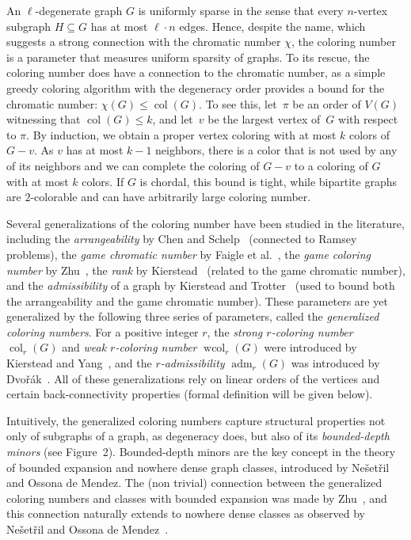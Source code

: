 \documentclass[1p,number,a4paper]{elsarticle}
\theoremstyle{remark}
\DeclareMathOperator{\col}{col}
\DeclareMathOperator{\wcol}{wcol}
\DeclareMathOperator{\adm}{adm}
\begin{document}
An $\ell$-degenerate graph $G$ is uniformly sparse in the
sense that every $n$-vertex subgraph $H\subseteq G$ 
has at most $\ell\cdot n$
edges.
Hence, despite the name, which suggests a strong connection with
the chromatic number $\chi$, the coloring number
is a parameter that measures uniform sparsity of graphs. 
To its rescue, the coloring number does have a connection to the chromatic number, as a simple greedy coloring algorithm with the degeneracy order provides a bound for the chromatic number: \mbox{$\chi(G)\leq \col(G)$}. To see this, 
let~$\pi$ be an order of $V(G)$ witnessing that $\col(G)\leq k$, 
and let~$v$ be 
the largest vertex of~$G$ with respect to $\pi$. By induction,
we obtain a proper vertex coloring with at most $k$ colors of 
$G-v$. As $v$ has at most $k-1$ neighbors, there is a 
color that is not used by any of its neighbors and we can complete
the coloring of $G-v$ to a coloring of $G$ with at most $k$ colors. 
If $G$ is chordal, this bound is 
tight, while bipartite graphs are $2$-colorable and 
can have arbitrarily large coloring number.

Several generalizations of the coloring number have been studied 
in the literature, including the \emph{arrangeability} by Chen and Schelp~\cite{chen1993graphs}  (connected to Ramsey problems), the \emph{game chromatic number} by Faigle et al.~\cite{faigle1993game}, the \emph{game coloring number} by Zhu~\cite{ZHU1999245}, the \emph{rank} by Kierstead~\cite{kierstead2000simple} (related to the game chromatic number), 
and the \emph{admissibility} of a graph by Kierstead and Trotter~\cite{kierstead1994planar} (used to bound both the arrangeability and the game chromatic number). 
These parameters are yet generalized by the following three 
series of parameters, called the \emph{generalized coloring numbers}.  
For a positive integer $r$, the \emph{strong $r$-coloring number} 
$\col_r(G)$ and \emph{weak $r$-coloring number} $\wcol_r(G)$ were 
introduced by Kierstead and Yang~\cite{kierstead2003orderings},
and the \emph{$r$-admissibility} $\adm_r(G)$ 
was introduced by Dvo\v{r}\'ak~\cite{dvovrak2013constant}. 
All of these generalizations rely on linear orders of the vertices and certain back-connectivity properties (formal definition will be given 
below). 


Intuitively, the generalized coloring numbers capture
structural properties not only of subgraphs of a graph, as degeneracy
does, but also 
of its \emph{bounded-depth minors} (see Figure~2). Bounded-depth minors
are the key concept in the theory of bounded  
expansion and nowhere dense graph classes, introduced by
Ne\v{s}et\v{r}il and Ossona de Mendez. The (non trivial) connection between the 
generalized coloring numbers and classes with bounded expansion was made by 
Zhu~\cite{zhu2009colouring}, and this connection naturally extends to nowhere dense classes as observed by Ne\v{s}et\v{r}il and Ossona de Mendez~\cite{nevsetvril2011nowhere}.
\end{document}
